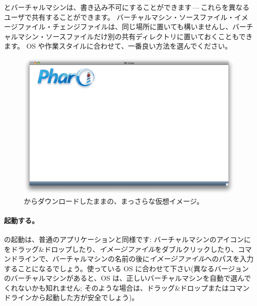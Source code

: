 \documentclass[a4paper,10pt,twoside]{book}
\begin{document}
とバーチャルマシンは、書き込み不可にすることができます\,---\,これらを異なるユーザで共有することができます。
バーチャルマシン・ソースファイル・イメージファイル・チェンジファイルは、同じ場所に置いても構いませんし、バーチャルマシン・ソースファイルだけ別の共有ディレクトリに置いておくこともできます。
OS や作業スタイルに合わせて、一番良い方法を選んでください。


\begin{figure}[htb]
\centerline {\includegraphics[width=\textwidth]{startup}}
\caption{\pbe からダウンロードしたままの、まっさらな仮想イメージ。}
\end{figure}

\paragraph{起動する。} \pharo の起動は、普通のアプリケーションと同様です: バーチャルマシンのアイコンにをドラッグ\&ドロップしたり、\emph{イメージファイル}をダブルクリックしたり、コマンドラインで、バーチャルマシンの名前の後に\emph{イメージファイル}へのパスを入力することになるでしょう。使っている OS に合わせて下さい(異なるバージョンのバーチャルマシンがあると、OS は、正しいバーチャルマシンを自動で選んでくれないかも知れません; そのような場合は、ドラッグ\&ドロップまたはコマンドラインから起動した方が安全でしょう)。
\end{document}
